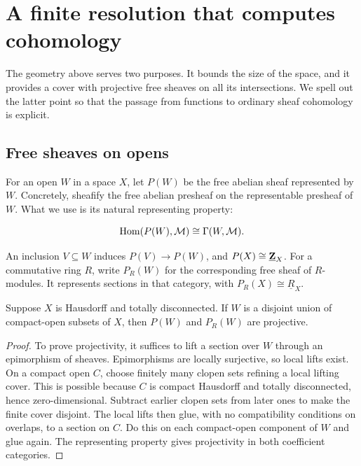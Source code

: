 \section{A finite resolution that computes cohomology}
\label{sec:resolution}

The geometry above serves two purposes. It bounds the size of the
space, and it provides a cover with projective free sheaves on all its
intersections. We spell out the latter point so that the passage from
functions to ordinary sheaf cohomology is explicit.

\subsection{Free sheaves on opens}

For an open \(W\) in a space \(X\), let \(P(W)\) be the free
abelian sheaf represented by \(W\). Concretely, sheafify the free
abelian presheaf on the representable presheaf of \(W\). What we
use is its natural representing property:

\[
\operatorname{Hom}(P(W),\mathcal M)\cong\Gamma(W,\mathcal M).
\]

An inclusion \(V\subseteq W\) induces \(P(V)\to P(W)\),
and \(P(X)\cong\underline{\mathbf Z}_X\). For a commutative ring \(R\),
write \(P_R(W)\) for the corresponding free sheaf of \(R\)-modules.
It represents sections in that category, with
\(P_R(X)\cong\underline R_X\).

\begin{lemma}\label{lem:projective-opens}
Suppose \(X\) is Hausdorff and totally disconnected. If \(W\) is
a disjoint union of compact-open subsets of \(X\), then \(P(W)\)
and \(P_R(W)\) are projective.
\end{lemma}

\begin{proof}
To prove projectivity, it suffices to lift a section over \(W\)
through an epimorphism of sheaves. Epimorphisms are locally surjective,
so local lifts exist. On a compact open \(C\), choose finitely many
clopen sets refining a local lifting cover. This is possible because
\(C\) is compact Hausdorff and totally disconnected, hence
zero-dimensional. Subtract earlier clopen sets from later ones to
make the finite cover disjoint. The local lifts then glue, with no
compatibility conditions on overlaps, to a section on \(C\).
Do this on each compact-open component of \(W\) and glue again.
The representing property gives projectivity in both coefficient
categories.
\end{proof}

